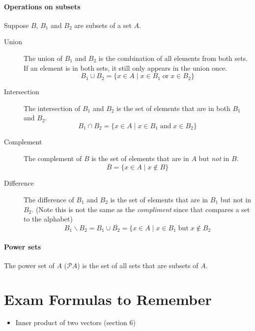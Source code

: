 \documentclass{article}
\begin{document}
\paragraph{Operations on subsets} Suppose $B$, $B_1$ and $B_2$ are subsets of a set $A$.
\begin{description}
\item [Union] The union of $B_1$ and $B_2$ is the combination of all elements from both sets. If an element is in both sets, it still only appears in the union once.
$$B_1 \cup B_2 = \{x\in A\; |\; x\in B_1\; \text{or}\; x\in B_2\}$$
\item [Intersection] The intersection of $B_1$ and $B_2$ is the set of elements that are in both $B_1$ and $B_2$.
$$B_1 \cap B_2 = \{x\in A\; |\; x\in B_1\; \text{and}\; x\in B_2\}$$
\item [Complement] The complement of $B$ is the set of elements that are in $A$ but \textit{not} in $B$.
$$\overline{B}=\{x\in A\; |\; x\notin B\}$$
\item [Difference] The difference of $B_1$ and $B_2$ is the set of elements that are in $B_1$ but not in $B_2$. (Note this is not the same as the \textit{compliment} since that compares a set to the alphabet)
$$B_1 \backslash B_2=B_1 \cup \overline{B_2}=\{ x\in A\; |\; x\in B_1\; \text{but}\; x\notin B_2$$
\end{description}

\paragraph{Power sets} The power set of $A$ ($\mathscr{P} A$) is the set of all sets that are subsets of $A$.

\section{Exam Formulas to Remember}
\begin{itemize}
\item Inner product of two vectors (section 6)
\end{itemize}
\end{document}
